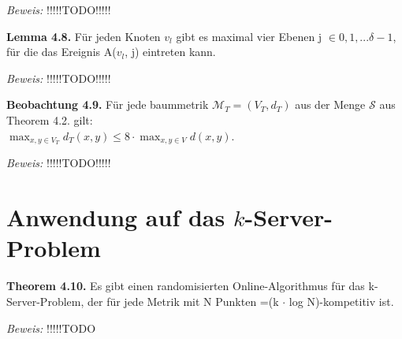 \textit{Beweis:} !!!!!TODO!!!!!

\textbf{Lemma 4.8.} Für jeden Knoten $v_{l}$ gibt es maximal vier Ebenen j $\in {0, 1, ... \delta - 1}$, für die das Ereignis A($v_{l}$, j) eintreten kann.

\textit{Beweis:} !!!!!TODO!!!!!

\textbf{Beobachtung 4.9.} Für jede baummetrik $\mathcal{M}_{T} = (V_{T}, d_{T})$ aus der Menge $\mathcal{S}$ aus Theorem 4.2. gilt: \\
$\max_{x, y \in V_{T}} d_{T}(x, y) \le 8 \cdot \max_{x, y \in V} d(x, y)$.

\textit{Beweis:} !!!!!TODO!!!!!

\section{Anwendung auf das $k$-Server-Problem}


\textbf{Theorem 4.10.} Es gibt einen randomisierten Online-Algorithmus für das k-Server-Problem, der für jede Metrik mit N Punkten =(k $\cdot$ log N)-kompetitiv ist.

\textit{Beweis:} !!!!!TODO
